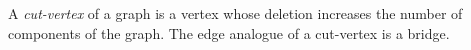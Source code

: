 \documentclass[12pt]{article}
\begin{document}
A \emph{cut-vertex} of a graph
is a vertex whose deletion increases the number of components of the graph.
The edge analogue of a cut-vertex is a bridge.
\end{document}
